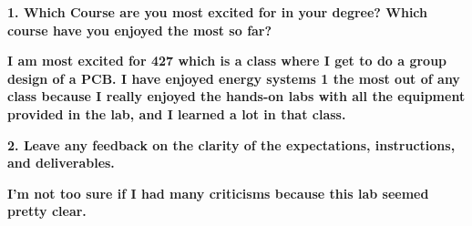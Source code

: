 \documentclass[12pt,a4paper]{article}
\begin{document}
\textbf{1. Which Course are you most excited for in your degree? Which course have you enjoyed the most so far?}

{\indent \textbf{I am most excited for 427 which is a class where I get to do a group design of a PCB. I have enjoyed energy systems 1 the most out of any class because I really enjoyed the hands-on labs with all the equipment provided in the lab, and I learned a lot in that class.} }



\textbf{2. Leave any feedback on the clarity of the expectations, instructions, and deliverables.}


\textbf{I'm not too sure if I had many criticisms because this lab seemed pretty clear.}

\indent \textbf{}



\end{document}
